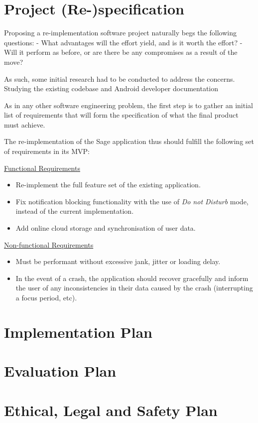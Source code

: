 \section{Project (Re-)specification}
Proposing a re-implementation software project naturally begs the following questions:
- What advantages will the effort yield, and is it worth the effort?
- Will it perform as before, or are there be any compromises as a result of the move?

As such, some initial research had to be conducted to address the concerns. 
Studying the existing codebase and Android developer documentation 

As in any other software engineering problem, the first step is to gather an initial list of requirements that will form the specification of what the final product must achieve. 



The re-implementation of the Sage application thus should fulfill the following set of requirements in its MVP:

\underline{Functional Requirements}
\begin{itemize}
    \item Re-implement the full feature set of the existing application.
    \item Fix notification blocking functionality with the use of \textit{Do not Disturb} mode, instead of the current implementation.
    \item Add online cloud storage and synchronisation of user data.
\end{itemize}

\underline{Non-functional Requirements}
\begin{itemize}
    \item Must be performant without excessive jank, jitter or loading delay.
    \item In the event of a crash, the application should recover gracefully and inform the user of any inconsistencies in their data caused by the crash (interrupting a focus period, etc).
\end{itemize}


\section{Implementation Plan}


\section{Evaluation Plan}


\section{Ethical, Legal and Safety Plan}